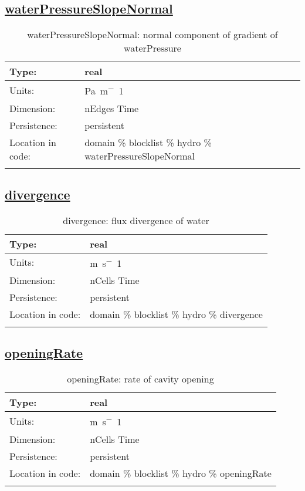\subsection[waterPressureSlopeNormal]{\hyperref[sec:var_tab_hydro]{waterPressureSlopeNormal}}
\label{subsec:var_sec_hydro_waterPressureSlopeNormal}
\begin{center}
\begin{longtable}{| p{2.0in} | p{4.0in} |}
        \hline 
        Type: & real \\
        \hline 
        Units: & \si{Pa.m^-1} \\
        \hline 
        Dimension: & nEdges Time \\
        \hline 
        Persistence: & persistent \\
        \hline 
         Location in code: & domain \% blocklist \% hydro \% waterPressureSlopeNormal \\
         \hline 
    \caption{waterPressureSlopeNormal: normal component of gradient of waterPressure}
\end{longtable}
\end{center}
\subsection[divergence]{\hyperref[sec:var_tab_hydro]{divergence}}
\label{subsec:var_sec_hydro_divergence}
\begin{center}
\begin{longtable}{| p{2.0in} | p{4.0in} |}
        \hline 
        Type: & real \\
        \hline 
        Units: & \si{m.s^-1} \\
        \hline 
        Dimension: & nCells Time \\
        \hline 
        Persistence: & persistent \\
        \hline 
         Location in code: & domain \% blocklist \% hydro \% divergence \\
         \hline 
    \caption{divergence: flux divergence of water}
\end{longtable}
\end{center}
\subsection[openingRate]{\hyperref[sec:var_tab_hydro]{openingRate}}
\label{subsec:var_sec_hydro_openingRate}
\begin{center}
\begin{longtable}{| p{2.0in} | p{4.0in} |}
        \hline 
        Type: & real \\
        \hline 
        Units: & \si{m.s^-1} \\
        \hline 
        Dimension: & nCells Time \\
        \hline 
        Persistence: & persistent \\
        \hline 
         Location in code: & domain \% blocklist \% hydro \% openingRate \\
         \hline 
    \caption{openingRate: rate of cavity opening}
\end{longtable}
\end{center}
